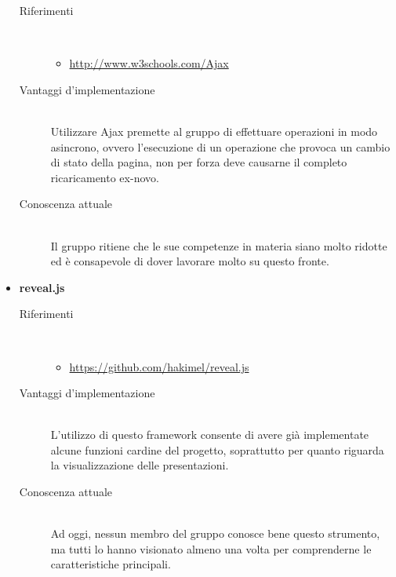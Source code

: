 \begin{itemize}
\begin{description}
		\item[Riferimenti] \hfill \\
		\begin{itemize}
			\item \url{http://www.w3schools.com/Ajax}
		\end{itemize}
		\item[Vantaggi d'implementazione] \hfill \\ Utilizzare Ajax premette al gruppo di effettuare operazioni in modo asincrono, ovvero l’esecuzione di un operazione che provoca un cambio di stato della pagina, non per forza deve causarne il completo ricaricamento ex-novo.
		\item[Conoscenza attuale]\hfill \\  Il gruppo ritiene che le sue competenze in materia siano molto ridotte ed è consapevole di dover lavorare molto su questo fronte.
	\end{description}
	\item \textbf{reveal.js}
	\begin{description}
		\item[Riferimenti] \hfill \\
		\begin{itemize}
			\item \url{https://github.com/hakimel/reveal.js}
		\end{itemize}
		\item[Vantaggi d'implementazione] \hfill \\ L’utilizzo di questo framework consente di avere già implementate alcune funzioni cardine del progetto, soprattutto per quanto riguarda la visualizzazione delle presentazioni.
		\item[Conoscenza attuale] \hfill \\  Ad oggi, nessun membro del gruppo conosce bene questo strumento, ma tutti lo hanno visionato almeno una volta per comprenderne le caratteristiche principali.
	\end{description}
\end{itemize}
